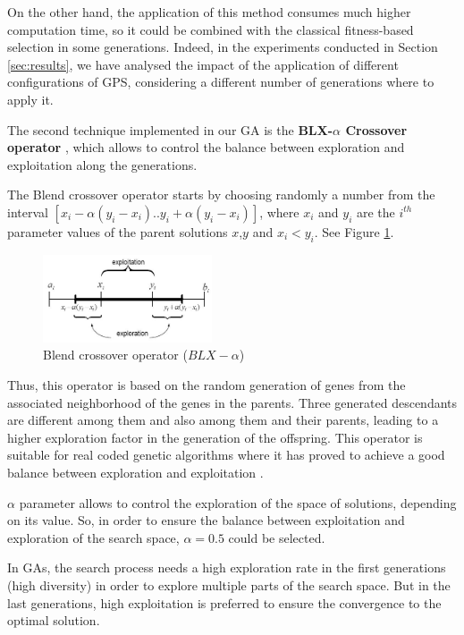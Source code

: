 \documentclass[10pt,journal,compsoc]{IEEEtran}
\begin{document}
On the other hand, the application of this method consumes much higher computation time, so it could be combined with the classical fitness-based selection in some generations. Indeed, in the experiments conducted in Section \ref{sec:results}, we have analysed the impact of the application of different configurations of GPS, considering a different number of generations where to apply it.

The second technique implemented in our GA is the \textbf{BLX-$\alpha$ Crossover operator} \cite{blx2008}, which allows to control the balance between exploration and exploitation along the generations.

The Blend crossover operator starts by choosing randomly a number from the interval $[x_i-\alpha(y_i-x_i).. y_i+\alpha(y_i-x_i)]$, where $x_i$ and $y_i$ are the $i^{th}$ parameter values of the parent solutions $x$,$y$ and $x_i < y_i$. See Figure \ref{fig:blxalpha}.

 \begin{figure}[!ht]	
 	\begin{center}
 		\includegraphics[width=5cm]{fig/blxalpha.jpg}
 		\caption{Blend crossover operator ($BLX-\alpha$)}
 		\label{fig:blxalpha}	
 	\end{center}	
 \end{figure}

Thus, this operator is based on the random generation of genes from the associated neighborhood of the genes in the parents. Three generated descendants are different among them and also among them and their parents, leading to a higher exploration factor in the generation of the offspring.
This operator is suitable for real coded genetic algorithms where it has proved to achieve a good balance between exploration and exploitation \cite{blx2008}.

$\alpha$ parameter allows to control the exploration of the space of solutions, depending on its value. So, in order to ensure the balance between exploitation and exploration of the search space, $\alpha = 0.5$ could be selected.

In GAs, the search process needs a high exploration rate in the first generations (high diversity) in order to explore multiple parts of the search space. But in the last generations, high exploitation is preferred to ensure the convergence to the optimal solution.
\end{document}

